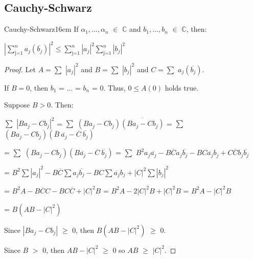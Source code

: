 	\vspace{0.5cm}





\subsection{ Cauchy-Schwarz } 

	\begin{wtheorem}{Cauchy-Schwarz}{16cm}
		If $\alpha_1 , ... , \alpha_n$ $\in$ $\mathbb{C}$ and
		$b_1 , ... , b_n$ $\in$ $\mathbb{C}$, then:

		\hspace{0.5cm}
		$| \sum_{\text{j=1}}^{n} a_j(\overline{b_j})  |^2 \leq
		\sum_{\text{j=1}}^{n} |a_j|^2 \sum_{\text{j=1}}^{n} |b_j|^2 $
	\end{wtheorem}

	\begin{proof}
		Let $A = \sum$ $|a_j|^2$ and $B = \sum$ $|b_j|^2$ and
		$C = \sum$ $a_j(\overline{b_j})$.

		If $B = 0$, then $b_1$ = ... = $b_n$ = 0. Thus, $0 \leq A(0)$ holds true.

		Suppose $B > 0$. Then:

		\hspace{1cm}
		$\sum$ $|Ba_j - Cb_j|^2$
		= $\sum$ $(Ba_j - Cb_j)\overline{(Ba_j - Cb_j)}$
		= $\sum$ $(Ba_j - Cb_j)(\overline{B} \ \overline{a_j}
		- \overline{C} \ \overline{b_j})$

		\hspace{1cm}
		= $\sum$ $(Ba_j-Cb_j)(B\overline{a_j} - \overline{C} \ \overline{b_j})$
		= $\sum$ $B^2a_j\overline{a_j} - B\overline{C}a_j\overline{b_j}
		- BC\overline{a_j}b_j + C\overline{C}b_j\overline{b_j}$

		\hspace{1cm}
		= $B^2 \sum |a_j|^2 - B\overline{C}\sum a_j\overline{b_j}
		- BC \sum \overline{a_j}b_j+ |C|^2 \sum |b_j|^2$

		\hspace{1cm}
		= $B^2A - B\overline{C}C - BC\overline{C} + |C|^2B$
		= $B^2A - 2|C|^2B + |C|^2B$ = $B^2A -|C|^2B$

		\hspace{1cm}
		= $B(AB - |C|^2)$

		Since $| Ba_j - Cb_j |$ $\geq$ 0, then $B(AB - |C|^2)$ $\geq$ 0.

		Since $B$ $>$ 0, then $AB - |C|^2$ $\geq$ 0 so $AB$ $\geq$ $|C|^2$.
	\end{proof}
	
